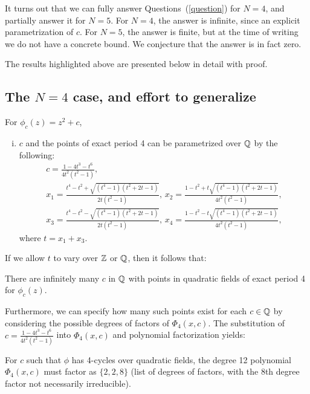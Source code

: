 It turns out that we can fully answer Questions~(\ref{question}) for
$N = 4$, and partially answer it for $N = 5$. For $N = 4$, the answer
is infinite, since an explicit parametrization of $c$. For $N =
5$, the answer is finite, but at the time of writing we do not have a
concrete bound. We conjecture that the answer is in fact zero.

The results highlighted above are presented below in detail with
proof.

\subsection{The $N = 4$ case, and effort to generalize}


\begin{theorem} 
  For $\phi_c(z) = z^2 + c$,
  \begin{enumerate}[(i)]
  \item $c$ and the points of exact period 4 can be parametrized over
    $\mathbb{Q}$ by the following:
    \[
    \begin{gathered}
      c = \frac{1 - 4t^3 - t^6}{4t^2(t^2 - 1)}, \\
      x_1 = \frac{t^4 - t^2 + \sqrt{(t^4 - 1)(t^2 + 2t - 1)}}{2t(t^2 -
        1)},\,
      x_2 = \frac{1 - t^2 + t \sqrt{(t^4 - 1)(t^2 + 2t - 1)}}{4t^2(t^2
        - 1)}, \\
      x_3 = \frac{t^4 - t^2 - \sqrt{(t^4 - 1)(t^2 + 2t - 1)}}{2t(t^2 -
        1)},\,
      x_4 = \frac{1 - t^2 - t \sqrt{(t^4 - 1)(t^2 + 2t - 1)}}{4t^2(t^2
        - 1)},
  \end{gathered}
  \]
  where $t = x_1 + x_3$.

  \end{enumerate}
\end{theorem}

If we allow $t$ to vary over $\mathbb{Z}$ or $\mathbb{Q}$, then it follows that:

\begin{corollary}
        There are infinitely many $c$ in $\mathbb{Q}$ with points in quadratic
        fields of exact period 4 for $\phi_c(z)$.
\end{corollary}

Furthermore, we can specify how many such points exist for each $c
\in \mathbb{Q}$ by considering the possible degrees of factors of $\Phi_4(
x,c)$. The substitution of $c = \frac{1 - 4t^3 - t^6}{4t^2(t^2 - 1)}$
into $\Phi_4(x,c)$ and polynomial factorization yields:

\begin{lemma}
        For $c$ such that $\phi$ has 4-cycles over quadratic fields,
        the degree 12 polynomial $\Phi_4(x,c)$ must factor as $\{2,2,8\}$
        (list of degrees of factors, with the 8th degree factor not
        necessarily irreducible).
\end{lemma}

